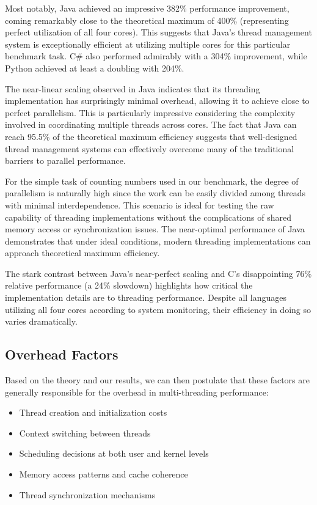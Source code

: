 \documentclass[12pt,a4paper]{article}
\begin{document}
Most notably, Java achieved an impressive 382\% performance improvement, coming remarkably close to the theoretical maximum of 400\% (representing perfect utilization of all four cores). This suggests that Java's thread management system is exceptionally efficient at utilizing multiple cores for this particular benchmark task. C\# also performed admirably with a 304\% improvement, while Python achieved at least a doubling with 204\%.

The near-linear scaling observed in Java indicates that its threading implementation has surprisingly minimal overhead, allowing it to achieve close to perfect parallelism. This is particularly impressive considering the complexity involved in coordinating multiple threads across cores. The fact that Java can reach 95.5\% of the theoretical maximum efficiency suggests that well-designed thread management systems can effectively overcome many of the traditional barriers to parallel performance.

For the simple task of counting numbers used in our benchmark, the degree of parallelism is naturally high since the work can be easily divided among threads with minimal interdependence. This scenario is ideal for testing the raw capability of threading implementations without the complications of shared memory access or synchronization issues. The near-optimal performance of Java demonstrates that under ideal conditions, modern threading implementations can approach theoretical maximum efficiency.

The stark contrast between Java's near-perfect scaling and C's disappointing 76\% relative performance (a 24\% slowdown) highlights how critical the implementation details are to threading performance. Despite all languages utilizing all four cores according to system monitoring, their efficiency in doing so varies dramatically.

\subsection{Overhead Factors}

Based on the theory and our results, we can then postulate that these factors are generally responsible for the overhead in multi-threading performance:

\begin{itemize}
    \item Thread creation and initialization costs
    \item Context switching between threads
    \item Scheduling decisions at both user and kernel levels
    \item Memory access patterns and cache coherence
    \item Thread synchronization mechanisms
\end{itemize}
\end{document}
